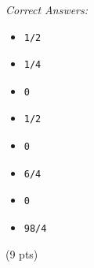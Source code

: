 \documentclass[10pt,dvips]{amsart}
\begin{document}
\par{\small{\it Correct Answers:}
\vspace{-\parskip}\begin{itemize}
\item\begin{verbatim}1/2\end{verbatim}
\item\begin{verbatim}1/4\end{verbatim}
\item\begin{verbatim}0\end{verbatim}
\item\begin{verbatim}1/2\end{verbatim}
\item\begin{verbatim}0\end{verbatim}
\item\begin{verbatim}6/4\end{verbatim}
\item\begin{verbatim}0\end{verbatim}
\item\begin{verbatim}98/4\end{verbatim}
\end{itemize}}\par
% 
% 


 (9 pts) \ifdim\lastskip=\pgmlMarker
  \let\pgmlPar=\relax
 \else
  \let\pgmlPar=\par
  \vadjust{\kern3pt}%
\fi
\end{document}
